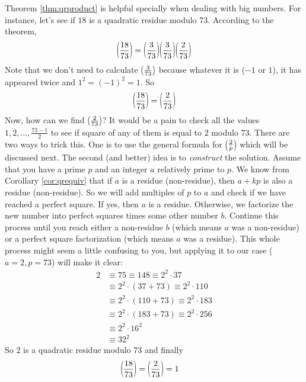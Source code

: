 \documentclass[main.tex]{subfile}
\begin{document}
	\begin{example}
		Theorem \eqref{thm:qrproduct} is helpful specially when dealing with big numbers. For instance, let's see if $18$ is a quadratic residue modulo $73$. According to the theorem,
		\begin{align*}
			\parenthesis{\dfrac{18}{73}} = \parenthesis{\dfrac{3}{73}} \parenthesis{\dfrac{3}{73}} \parenthesis{\dfrac{2}{73}}
		\end{align*}
		Note that we don't need to calculate $ \parenthesis{\frac{3}{73}}$ because whatever it is ($-1$ or $1$), it has appeared twice and $1^2=(-1)^2=1$. So
		\begin{align*}
			\parenthesis{\dfrac{18}{73}} = \parenthesis{\dfrac{2}{73}}
		\end{align*}
		Now, how can we find $ \parenthesis{\frac{2}{73}}$? It would be a pain to check all the values $1,2,\ldots, \frac{73-1}{2}$ to see if square of any of them is equal to $2$ modulo $73$. There are two ways to trick this. One is to use the general formula for $\parenthesis{\frac{2}{p}}$ which will be discussed next. The second (and better) idea is to \textit{construct} the solution. Assume that you have a prime $p$ and an integer $a$ relatively prime to $p$. We know from Corollary \ref{cor:qrequiv} that if $a$ is a residue (non-residue), then $a+kp$ is also a residue (non-residue). So we will add multiples of $p$ to $a$ and check if we have reached a perfect square. If yes, then $a$ is a residue. Otherwise, we factorize the new number into perfect squares times some other number $b$. Continue this process until you reach either a non-residue $b$ (which means $a$ was a non-residue) or a perfect square factorization (which means $a$ was a residue). This whole process might seem a little confusing to you, but applying it to our case ($a=2, p=73$) will make it clear:
		\begin{align*}
			2 &\equiv 75 \equiv 148\equiv 2^2 \cdot 37\\
			& \equiv 2^2\cdot (37+73) \equiv 2^2 \cdot 110\\
			&\equiv 2^2\cdot (110+73) \equiv 2^2 \cdot 183\\
			&\equiv 2^2\cdot (183+73) \equiv 2^2 \cdot 256\\
			&\equiv 2^2 \cdot 16^2\\
			&\equiv 32^2
		\end{align*}
		So $2$ is a quadratic residue modulo $73$ and finally
		\begin{align*}
			\parenthesis{\dfrac{18}{73}} = \parenthesis{\dfrac{2}{73}}
				& =1
		\end{align*}
	\end{example}
\end{document}
